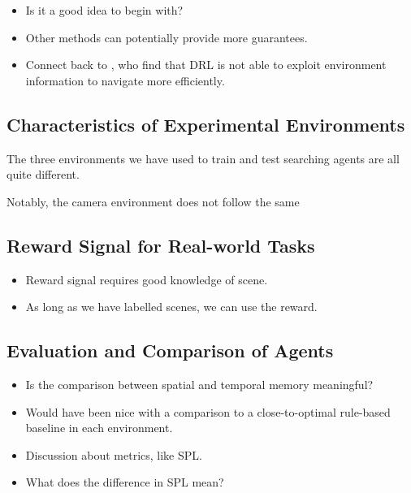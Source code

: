 \begin{itemize}
    \item Is it a good idea to begin with?
    \item Other methods can potentially provide more guarantees.
    \item Connect back to \cite{dhiman_critical_2019}, who find that DRL is not able to exploit environment information to navigate more efficiently.
\end{itemize}

\subsection{Characteristics of Experimental Environments}

The three environments we have used to train and test searching agents are all quite different.

Notably, the camera environment does not follow the same 

\subsection{Reward Signal for Real-world Tasks}

\begin{itemize}
    \item Reward signal requires good knowledge of scene.
    \item As long as we have labelled scenes, we can use the reward.
\end{itemize}

\subsection{Evaluation and Comparison of Agents}

\begin{itemize}
    \item Is the comparison between spatial and temporal memory meaningful?
    \item Would have been nice with a comparison to a close-to-optimal rule-based baseline in each environment.
    \item Discussion about metrics, like SPL.
    \item What does the difference in SPL mean?
\end{itemize}



